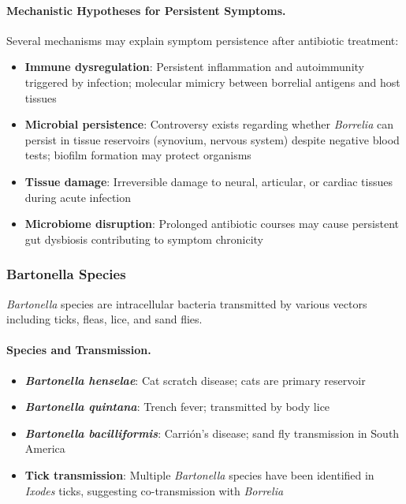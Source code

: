 \paragraph{Mechanistic Hypotheses for Persistent Symptoms.}
Several mechanisms may explain symptom persistence after antibiotic treatment:
\begin{itemize}
    \item \textbf{Immune dysregulation}: Persistent inflammation and autoimmunity triggered by infection; molecular mimicry between borrelial antigens and host tissues~\cite{Steere2016postLyme}
    \item \textbf{Microbial persistence}: Controversy exists regarding whether \emph{Borrelia} can persist in tissue reservoirs (synovium, nervous system) despite negative blood tests; biofilm formation may protect organisms
    \item \textbf{Tissue damage}: Irreversible damage to neural, articular, or cardiac tissues during acute infection
    \item \textbf{Microbiome disruption}: Prolonged antibiotic courses may cause persistent gut dysbiosis contributing to symptom chronicity
\end{itemize}

\subsubsection{Bartonella Species}

\emph{Bartonella} species are intracellular bacteria transmitted by various vectors including ticks, fleas, lice, and sand flies.

\paragraph{Species and Transmission.}
\begin{itemize}
    \item \textbf{\emph{Bartonella henselae}}: Cat scratch disease; cats are primary reservoir
    \item \textbf{\emph{Bartonella quintana}}: Trench fever; transmitted by body lice
    \item \textbf{\emph{Bartonella bacilliformis}}: Carrión's disease; sand fly transmission in South America
    \item \textbf{Tick transmission}: Multiple \emph{Bartonella} species have been identified in \emph{Ixodes} ticks, suggesting co-transmission with \emph{Borrelia}
\end{itemize}

